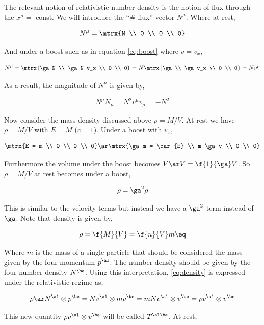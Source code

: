 \documentclass{article}
\begin{document}
The relevant notion of relativistic number density is the notion of flux through the $x^\mu = $ const. We will introduce the ``\#-flux'' vector $N^\mu$. Where at rest,

\[ N^\mu = \mtrx{N \\ 0 \\ 0 \\ 0} \]

And under a boost such as in equation \eqref{eq:boost} where $v = v_x$,

\[ N^\mu = \mtrx{\ga N \\ \ga N v_x \\ 0 \\ 0} = N \mtrx{\ga \\ \ga v_x \\ 0 \\ 0} = N v^\mu \]

As a result, the magnitude of $N^\mu$ is given by,

\[ N^\mu N_\mu = N^2 v^\mu v_\mu = - N^2 \]

Now consider the mass density discussed above $\rho = M/V$. At rest we have $\rho = M/V$ with $E = M$ ($c=1$). Under a boost with $v_x$,

\[ \mtrx{E = m \\ 0 \\ 0 \\ 0} \ar \mtrx{\ga m = \bar{E} \\ m \ga v \\ 0 \\ 0} \]

Furthermore the volume under the boost becomes $V \ar \bar{V} = \f{1}{\ga} V$. So $\rho = M/V$ at rest becomes under a boost,

\[ \bar{\rho} = \ga^2 \rho \]

This is similar to the velocity terms but instead we have a $\ga^2$ term instead of $\ga$. Note that density is given by,

\[ \rho = \f{M}{V} = \f{n}{V} m \eq \label{eq:density}\]

Where $m$ is the mass of a single particle that should be considered the mass given by the four-momentum $p^\al$. The number density should be given by the four-number density $N^\be$. Using this interpretation, \eqref{eq:density} is expressed under the relativistic regime as,

\[ \rho \ar  N^\al \otimes p^\be = N v^\al \otimes m v^\be = m N v^\al \otimes v^\be = \rho v^\al \otimes v^\be \]

This new quantity $\rho v^\al \otimes v^\be$ will be called $T^{\al\be}$. At rest,
\end{document}
